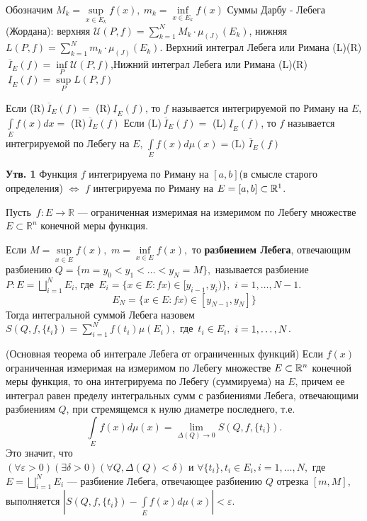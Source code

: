 \begin{multicols}{2}
\begin{definition}{}{}
Обозначим $M_k=\sup\limits_{x\in E_k} f\left(x\right) ,\  m_k=\inf\limits_{x\in E_k}f\left(x\right)$ \newline
Суммы Дарбу - Лебега (Жордана): верхняя $\mathcal{U}(P, f)=\sum\limits_{k=1}^N M_k \cdot \mu_{(J)}(E_k)$, нижняя $L(P, f)=\sum\limits_{k=1}^N m_k \cdot \mu_{(J)}(E_k)$.
\newline Верхний интеграл Лебега или Римана (L)(R)$\ \overline{I}_E(f)=\inf\limits_P \mathcal{U}(P, f)$,\newline Нижний интеграл Лебега или Римана (L)(R)$\ \underline{I}_E(f)=\sup\limits_P L(P, f)$
\end{definition}
\begin{definition}{}{}
Если (R)$\ \overline{I}_E(f)=$ (R)$\ \underline{I}_E(f)$, то $f$ называется интегрируемой по Риману на $E$, $\int\limits_E f(x)dx=$ (R)$\ \overline{I}_E(f)$ \newline
Если (L)$\ \overline{I}_E(f)=$ (L)$\ \underline{I}_E(f)$, то $f$ называется интегрируемой по Лебегу на $E$, $\int\limits_E f(x)d\mu (x)= \text{(L) }\overline{I}_E(f)$
\end{definition}
\textbf{Утв. 1} Функция $f$ интегрируема по Риману на $[a,b]$(в смысле старого определения) $\Leftrightarrow$ $f$ интегрируема по Риману на $E=[a,b] \subset \mathbb{R}^1$.
\begin{definition}{}{}
	\mbox{Пусть $ f:E\to\mathbb{R} $} ---  ограниченная измеримая на измеримом по Лебегу множестве \mbox{$ E\subset\mathbb{R}^n $} конечной меры функция.

	Если $ M=\sup\limits_{x\in E}f(x), $ $ m=\inf\limits_{x\in E}f(x), $ то \textbf{разбиением Лебега}, отвечающим разбиению $ Q=\{m=y_0<y_1<\ldots <y_N=M\}, $ называется разбиение
	$ P: E=\bigsqcup\limits_{i=1}^{N}E_i$, \mbox{где $E_i=\{x\in E: fx)\in [y_{i-1}, y_i)\},$} $i=1, \ldots, N-1$.
	\[E_N= \{x\in E: fx)\in [y_{N-1}, y_N]\}\]
	Тогда интегральной суммой Лебега назовем \mbox{$S(Q, f, \{t_i\})=\sum\limits_{i=1}^N f(t_i)\mu(E_i)$, где $t_i \in E_i,$} $ 
	\newline i = 1, \ldots, N$.
\end{definition} 
\begin{theorema}{(Основная теорема об интеграле Лебега от ограниченных функций)}{}
	Если $f(x)$ ограниченная измеримая на измеримом по Лебегу множестве $ E\subset\mathbb{R}^n $ конечной меры  функция, то она интегрируема по Лебегу (суммируема) на $E$, причем ее интеграл равен пределу интегральных сумм с разбиениями Лебега, отвечающими разбиениям  $ Q $, при стремящемся к нулю диаметре последнего, т.е. $$\int\limits_E f(x)d\mu(x)=\lim_{\Delta(Q)\to 0}S(Q,f,\{t_i\}).$$
	Это значит, что $(\forall \varepsilon >0)(\exists \delta > 0)(\forall Q, \Delta(Q)<\delta) \text{ и } \forall \{t_i\}, t_i \in E_i, i=1,\ldots, N,$ где $E=\bigsqcup\limits_{i=1}^N E_i$ --- разбиение Лебега, отвечающее разбиению $Q$ отрезка $[m, M]$, выполняется $|S(Q, f, \{t_i\})-\int\limits_E f(x)d\mu(x)|<\varepsilon$.
\end{theorema}


\end{multicols}
